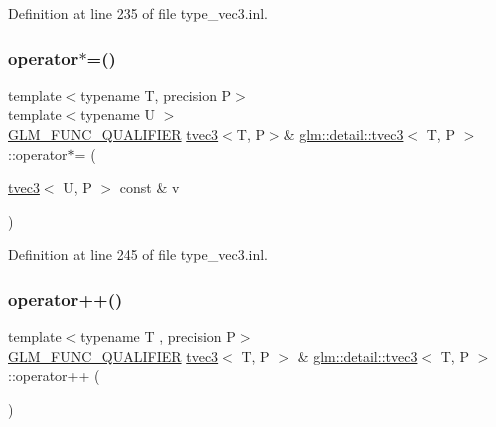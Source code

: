 Definition at line 235 of file type\+\_\+vec3.\+inl.

\mbox{\label{structglm_1_1detail_1_1tvec3_a1d2ab1093230a4404781d65564e4f7d0}} 
\subsubsection{\texorpdfstring{operator$\ast$=()}{operator*=()}\hspace{0.1cm}{\footnotesize\ttfamily [4/4]}}
{\footnotesize\ttfamily template$<$typename T, precision P$>$ \\
template$<$typename U $>$ \\
\hyperlink{setup_8hpp_a33fdea6f91c5f834105f7415e2a64407}{G\+L\+M\+\_\+\+F\+U\+N\+C\+\_\+\+Q\+U\+A\+L\+I\+F\+I\+ER} \hyperlink{structglm_1_1detail_1_1tvec3}{tvec3}$<$T, P$>$\& \hyperlink{structglm_1_1detail_1_1tvec3}{glm\+::detail\+::tvec3}$<$ T, P $>$\+::operator$\ast$= (\begin{DoxyParamCaption}\item[{\hyperlink{structglm_1_1detail_1_1tvec3}{tvec3}$<$ U, P $>$ const \&}]{v }\end{DoxyParamCaption})}



Definition at line 245 of file type\+\_\+vec3.\+inl.

\mbox{\label{structglm_1_1detail_1_1tvec3_a01056db42bfb77a320bf3516ea4951b4}} 
\subsubsection{\texorpdfstring{operator++()}{operator++()}\hspace{0.1cm}{\footnotesize\ttfamily [1/2]}}
{\footnotesize\ttfamily template$<$typename T , precision P$>$ \\
\hyperlink{setup_8hpp_a33fdea6f91c5f834105f7415e2a64407}{G\+L\+M\+\_\+\+F\+U\+N\+C\+\_\+\+Q\+U\+A\+L\+I\+F\+I\+ER} \hyperlink{structglm_1_1detail_1_1tvec3}{tvec3}$<$ T, P $>$ \& \hyperlink{structglm_1_1detail_1_1tvec3}{glm\+::detail\+::tvec3}$<$ T, P $>$\+::operator++ (\begin{DoxyParamCaption}{ }\end{DoxyParamCaption})}



